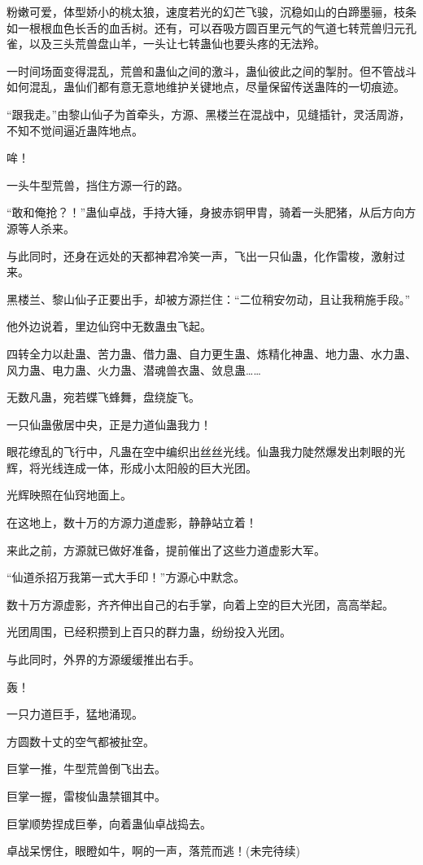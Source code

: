 \begin{this_body}
粉嫩可爱，体型娇小的桃太狼，速度若光的幻芒飞骏，沉稳如山的白蹄墨骊，枝条如一根根血色长舌的血舌树。还有，可以吞吸方圆百里元气的气道七转荒兽归元孔雀，以及三头荒兽盘山羊，一头让七转蛊仙也要头疼的无法羚。

一时间场面变得混乱，荒兽和蛊仙之间的激斗，蛊仙彼此之间的掣肘。但不管战斗如何混乱，蛊仙们都有意无意地维护关键地点，尽量保留传送蛊阵的一切痕迹。

“跟我走。”由黎山仙子为首牵头，方源、黑楼兰在混战中，见缝插针，灵活周游，不知不觉间逼近蛊阵地点。

哞！

一头牛型荒兽，挡住方源一行的路。

“敢和俺抢？！”蛊仙卓战，手持大锤，身披赤铜甲胄，骑着一头肥猪，从后方向方源等人杀来。

与此同时，还身在远处的天都神君冷笑一声，飞出一只仙蛊，化作雷梭，激射过来。

黑楼兰、黎山仙子正要出手，却被方源拦住：“二位稍安勿动，且让我稍施手段。”

他外边说着，里边仙窍中无数蛊虫飞起。

四转全力以赴蛊、苦力蛊、借力蛊、自力更生蛊、炼精化神蛊、地力蛊、水力蛊、风力蛊、电力蛊、火力蛊、潜魂兽衣蛊、敛息蛊……

无数凡蛊，宛若蝶飞蜂舞，盘绕旋飞。

一只仙蛊傲居中央，正是力道仙蛊我力！

眼花缭乱的飞行中，凡蛊在空中编织出丝丝光线。仙蛊我力陡然爆发出刺眼的光辉，将光线连成一体，形成小太阳般的巨大光团。

光辉映照在仙窍地面上。

在这地上，数十万的方源力道虚影，静静站立着！

来此之前，方源就已做好准备，提前催出了这些力道虚影大军。

“仙道杀招万我第一式大手印！”方源心中默念。

数十万方源虚影，齐齐伸出自己的右手掌，向着上空的巨大光团，高高举起。

光团周围，已经积攒到上百只的群力蛊，纷纷投入光团。

与此同时，外界的方源缓缓推出右手。

轰！

一只力道巨手，猛地涌现。

方圆数十丈的空气都被扯空。

巨掌一推，牛型荒兽倒飞出去。

巨掌一握，雷梭仙蛊禁锢其中。

巨掌顺势捏成巨拳，向着蛊仙卓战捣去。

卓战呆愣住，眼瞪如牛，啊的一声，落荒而逃！(未完待续)

\end{this_body}

